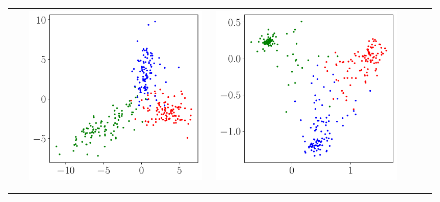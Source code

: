 \begin{figure}[ht]
{\begin{tabular}{m{.03\linewidth}*4{C}@{}}
            & \includegraphics[width=\linewidth]{figures/alexnet_penultimate_plot_0.pdf} 
            & \includegraphics[width=\linewidth]{figures/alexnet_penultimate_plot_2.pdf}\\ 

\end{tabular}}
\end{figure}
